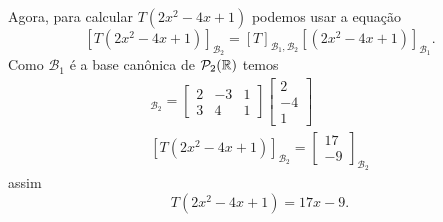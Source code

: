 \begin{exemplos}
\begin{enumerate}[label={\arabic*})]
\begin{solucao}
      Agora, para calcular $T(2x^2 - 4x + 1)$ podemos usar a equação
      \[
        [T(2x^2 - 4x + 1)]_{\mathcal{B}_2} = [T]_{\mathcal{B}_1, \mathcal{B}_2}[(2x^2 - 4x + 1)]_{\mathcal{B}_1}.
      \]
      Como $\mathcal{B}_1$ é a base canônica de $\mathcal{P}_2(\mathbb{R})$ temos
      \begin{align*}
        [T(2x^2 - 4x + 1)]_{\mathcal{B}_2} = \begin{bmatrix}2 & -3 & 1\\3 & 4 & 1\end{bmatrix}\begin{bmatrix}2 \\ -4\\1\end{bmatrix}\\
        [T(2x^2 - 4x + 1)]_{\mathcal{B}_2} = \begin{bmatrix}17 \\ -9\end{bmatrix}_{\mathcal{B}_2}
      \end{align*}
      assim
      \[
        T(2x^2 - 4x + 1) = 17x - 9.
      \]
    \end{solucao}


\end{enumerate}
\end{exemplos}
